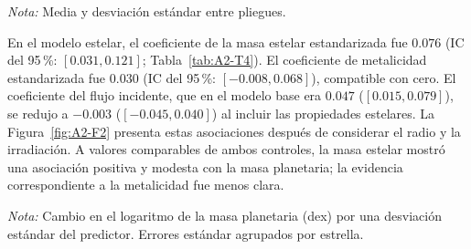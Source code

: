 \begin{table}[htbp]
    \centering
    \caption{Análisis II: desempeño en validación cruzada de cinco pliegues agrupada por estrella. Diferencias respecto al modelo base M1.}
    \label{tab:A2-T3}
    \small
    \par\smallskip
    {\footnotesize\textit{Nota:} Media y desviación estándar entre pliegues.}
\end{table}

En el modelo estelar, el coeficiente de la masa estelar estandarizada fue $0.076$ (IC del 95\,\%: $[0.031,0.121]$; Tabla~\ref{tab:A2-T4}). El coeficiente de metalicidad estandarizada fue $0.030$ (IC del 95\,\%: $[-0.008,0.068]$), compatible con cero. El coeficiente del flujo incidente, que en el modelo base era $0.047$ ($[0.015,0.079]$), se redujo a $-0.003$ ($[-0.045,0.040]$) al incluir las propiedades estelares. La Figura~\ref{fig:A2-F2} presenta estas asociaciones después de considerar el radio y la irradiación. A valores comparables de ambos controles, la masa estelar mostró una asociación positiva y modesta con la masa planetaria; la evidencia correspondiente a la metalicidad fue menos clara.

\begin{table}[htbp]
    \centering
    \caption{Análisis II: coeficientes estandarizados del flujo incidente, la masa estelar y la metalicidad en los modelos M1 y M2.}
    \label{tab:A2-T4}
    \small
    \par\smallskip
    {\footnotesize\textit{Nota:} Cambio en el logaritmo de la masa planetaria (dex) por una desviación estándar del predictor. Errores estándar agrupados por estrella.}
\end{table}

